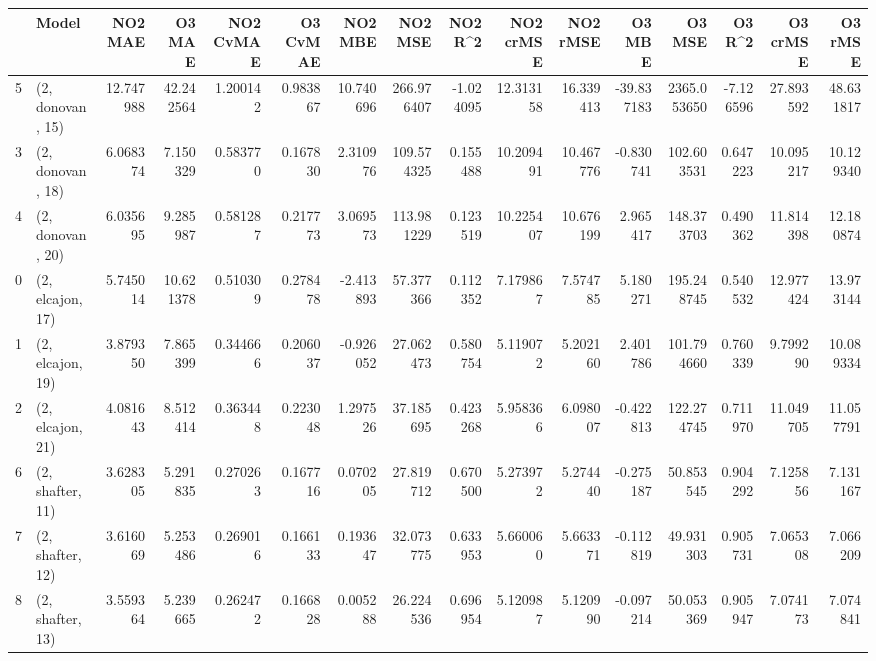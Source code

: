\begin{tabular}{llrrrrrrrrrrrrrr}
\toprule
{} &             Model &    NO2 MAE &     O3 MAE &  NO2 CvMAE &  O3 CvMAE &    NO2 MBE &     NO2 MSE &   NO2 R\textasciicircum2 &  NO2 crMSE &   NO2 rMSE &     O3 MBE &       O3 MSE &    O3 R\textasciicircum2 &   O3 crMSE &    O3 rMSE \\
\midrule
5  &  (2, donovan, 15) &  12.747988 &  42.242564 &   1.200142 &  0.983867 &  10.740696 &  266.976407 & -1.024095 &  12.313158 &  16.339413 & -39.837183 &  2365.053650 & -7.126596 &  27.893592 &  48.631817 \\
3  &  (2, donovan, 18) &   6.068374 &   7.150329 &   0.583770 &  0.167830 &   2.310976 &  109.574325 &  0.155488 &  10.209491 &  10.467776 &  -0.830741 &   102.603531 &  0.647223 &  10.095217 &  10.129340 \\
4  &  (2, donovan, 20) &   6.035695 &   9.285987 &   0.581287 &  0.217773 &   3.069573 &  113.981229 &  0.123519 &  10.225407 &  10.676199 &   2.965417 &   148.373703 &  0.490362 &  11.814398 &  12.180874 \\
0  &  (2, elcajon, 17) &   5.745014 &  10.621378 &   0.510309 &  0.278478 &  -2.413893 &   57.377366 &  0.112352 &   7.179867 &   7.574785 &   5.180271 &   195.248745 &  0.540532 &  12.977424 &  13.973144 \\
1  &  (2, elcajon, 19) &   3.879350 &   7.865399 &   0.344666 &  0.206037 &  -0.926052 &   27.062473 &  0.580754 &   5.119072 &   5.202160 &   2.401786 &   101.794660 &  0.760339 &   9.799290 &  10.089334 \\
2  &  (2, elcajon, 21) &   4.081643 &   8.512414 &   0.363448 &  0.223048 &   1.297526 &   37.185695 &  0.423268 &   5.958366 &   6.098007 &  -0.422813 &   122.274745 &  0.711970 &  11.049705 &  11.057791 \\
6  &  (2, shafter, 11) &   3.628305 &   5.291835 &   0.270263 &  0.167716 &   0.070205 &   27.819712 &  0.670500 &   5.273972 &   5.274440 &  -0.275187 &    50.853545 &  0.904292 &   7.125856 &   7.131167 \\
7  &  (2, shafter, 12) &   3.616069 &   5.253486 &   0.269016 &  0.166133 &   0.193647 &   32.073775 &  0.633953 &   5.660060 &   5.663371 &  -0.112819 &    49.931303 &  0.905731 &   7.065308 &   7.066209 \\
8  &  (2, shafter, 13) &   3.559364 &   5.239665 &   0.262472 &  0.166828 &   0.005288 &   26.224536 &  0.696954 &   5.120987 &   5.120990 &  -0.097214 &    50.053369 &  0.905947 &   7.074173 &   7.074841 \\

\end{tabular}
